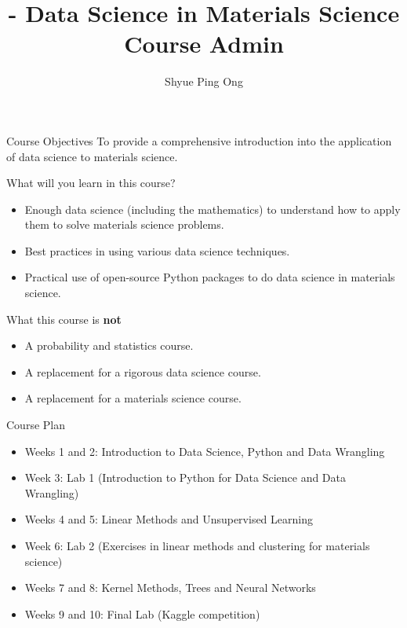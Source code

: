 \documentclass[aspectratio=169]{beamer}
\title[\classname Course Admin]{\classname - Data Science in Materials Science\\Course Admin}
\author{Shyue Ping Ong}
\institute[UCSD]{University of California, San Diego\\
\medskip
}
\date{\classyear} %
\begin{document}
\begin{frame}
    \titlepage %
\end{frame}


\begin{frame}{Course Objectives}
\huge{To provide a comprehensive introduction into the application of data science to materials science.}
\end{frame}


\begin{frame}{What will you learn in this course?}
    \begin{itemize}
        \item Enough data science (including the mathematics) to understand how to apply them to solve materials science problems.
        \item Best practices in using various data science techniques.
        \item Practical use of open-source Python packages to do data science in materials science.
    \end{itemize}
\end{frame}


\begin{frame}{What this course is \textbf{not}}
    \begin{itemize}
        \item A probability and statistics course.
        \item A replacement for a rigorous data science course.
        \item A replacement for a materials science course.
    \end{itemize}
\end{frame}


\begin{frame}{Course Plan}
    \begin{itemize}
        \item Weeks 1 and 2: Introduction to Data Science, Python and Data Wrangling
        \item Week 3: Lab 1 (Introduction to Python for Data Science and Data Wrangling)
        \item Weeks 4 and 5: Linear Methods and Unsupervised Learning
        \item Week 6: Lab 2 (Exercises in linear methods and clustering for materials science)
        \item Weeks 7 and 8: Kernel Methods, Trees and Neural Networks
        \item Weeks 9 and 10: Final Lab (Kaggle competition)
    \end{itemize}
\end{frame}
\end{document}
